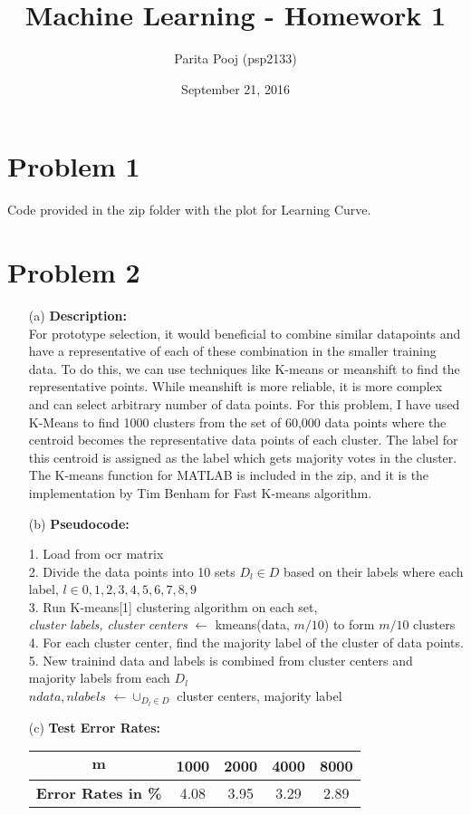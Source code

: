 \documentclass[fleqn]{article}
\title{Machine Learning - Homework 1}
\author{Parita Pooj (psp2133)}
\date{September 21, 2016}
\begin{document}
\maketitle
\setcounter{secnumdepth}{0}
\section{Problem 1}
Code provided in the zip folder with the plot for Learning Curve.
\section{Problem 2}
\begin{itemize}
\item[(a)] \textbf{Description:}\\ 
        For prototype selection, it would beneficial to combine similar datapoints 
        and have a representative of each of these combination in the smaller
        training data. To do this, we can use techniques like K-means or meanshift to
        find the representative points. While meanshift is more reliable, it is more
        complex and can select arbitrary number of data points. For this problem, I 
        have used K-Means to find 1000 clusters from the set of 60,000 data points 
        where the centroid becomes the representative data points of each cluster.
        The label for this centroid is assigned as the label which gets majority 
        votes in the cluster.
        The K-means function for MATLAB is included in the zip, and it is the
        implementation by Tim Benham for Fast K-means algorithm.
\item[(b)] \textbf{Pseudocode:}\\
        \begin{algorithm}
        1. Load from ocr matrix\\
        2. Divide the data points into 10 sets $D_l \in D$  based on their labels where each label, $l \in {0, 1, 2, 3, 4, 5, 6, 7, 8, 9}$\\
        3. Run K-means[1] clustering algorithm on each set,\\
        \textit{cluster labels, cluster centers} $\gets$ kmeans(data, $m/10$)
        to form $m/10$ clusters\\
        4. For each cluster center, find the majority label of the cluster of data points.\\
        5. New trainind data and labels is combined from cluster centers and majority labels from each $D_l$\\
        ${ndata, nlabels}$ $\gets \cup_{D_l \in D}$ cluster centers, majority label\\
        \end{algorithm}
\item[(c)] \textbf{Test Error Rates:}\\
        \begin{tabular}{ |c|c|c|c|c|} 
        \hline
        $\boldsymbol{m}$ & 1000 & 2000 & 4000 & 8000 \\
        \hline
        \textbf{Error Rates in \%} & 4.08 & 3.95 & 3.29 & 2.89 \\ 
        \hline
        \end{tabular}
\end{itemize}
\end{document}
